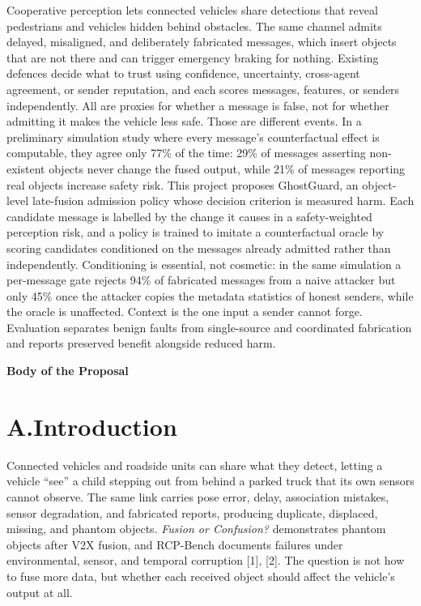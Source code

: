\documentclass[11pt]{article}
\begin{document}
Cooperative perception lets connected vehicles share detections that reveal
pedestrians and vehicles hidden behind obstacles. The same channel admits
delayed, misaligned, and deliberately fabricated messages, which insert objects
that are not there and can trigger emergency braking for nothing. Existing
defences decide what to trust using confidence, uncertainty, cross-agent
agreement, or sender reputation, and each scores messages, features, or senders
independently. All are proxies for whether a message is false, not for whether
admitting it makes the vehicle less safe. Those are different events. In a
preliminary simulation study where every message's counterfactual effect is
computable, they agree only 77\% of the time: 29\% of messages asserting
non-existent objects never change the fused output, while 21\% of messages
reporting real objects increase safety risk. This project proposes GhostGuard,
an object-level late-fusion admission policy whose decision criterion is
measured harm. Each candidate message is labelled by the change it causes in a
safety-weighted perception risk, and a policy is trained to imitate a
counterfactual oracle by scoring candidates conditioned on the messages already
admitted rather than independently. Conditioning is essential, not cosmetic: in
the same simulation a per-message gate rejects 94\% of fabricated messages from
a naive attacker but only 45\% once the attacker copies the metadata statistics
of honest senders, while the oracle is unaffected. Context is the one input a
sender cannot forge. Evaluation separates benign faults from single-source and
coordinated fabrication and reports preserved benefit alongside reduced harm.

\newpage

\begin{center}\textbf{\large Body of the Proposal}\end{center}

\section{A.\quad Introduction}

Connected vehicles and roadside units can share what they detect, letting a
vehicle ``see'' a child stepping out from behind a parked truck that its own
sensors cannot observe. The same link carries pose error, delay, association
mistakes, sensor degradation, and fabricated reports, producing duplicate,
displaced, missing, and phantom objects. \emph{Fusion or Confusion?}
demonstrates phantom objects after V2X fusion, and RCP-Bench documents failures
under environmental, sensor, and temporal corruption [1], [2]. The question is
not how to fuse more data, but whether each received object should affect the
vehicle's output at all.
\end{document}

